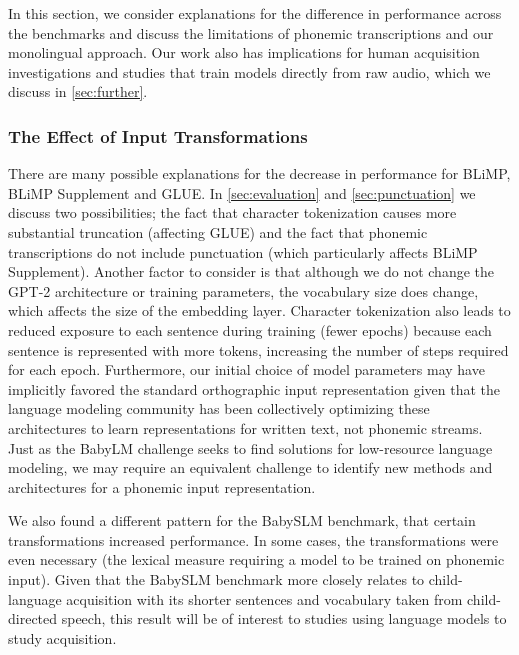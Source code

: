 In this section, we consider explanations for the difference in performance across the benchmarks and discuss the limitations of phonemic transcriptions and our monolingual approach. Our work also has implications for human acquisition investigations and studies that train models directly from raw audio, which we discuss in \cref{sec:further}.

\subsubsection{The Effect of Input Transformations}

There are many possible explanations for the decrease in performance for BLiMP, BLiMP Supplement and GLUE. In \cref{sec:evaluation} and \cref{sec:punctuation} we discuss two possibilities; the fact that character tokenization causes more substantial truncation (affecting GLUE) and the fact that phonemic transcriptions do not include punctuation (which particularly affects BLiMP Supplement). Another factor to consider is that although we do not change the GPT-2 architecture or training parameters, the vocabulary size does change, which affects the size of the embedding layer. Character tokenization also leads to reduced exposure to each sentence during training (fewer epochs) because each sentence is represented with more tokens, increasing the number of steps required for each epoch. Furthermore, our initial choice of model parameters may have implicitly favored the standard orthographic input representation given that the language modeling community has been collectively optimizing these architectures to learn representations for written text, not phonemic streams. Just as the BabyLM challenge seeks to find solutions for low-resource language modeling, we may require an equivalent challenge to identify new methods and architectures for a phonemic input representation. 

We also found a different pattern for the BabySLM benchmark, that certain transformations increased performance. In some cases, the transformations were even necessary (the lexical measure requiring a model to be trained on phonemic input). Given that the BabySLM benchmark more closely relates to child-language acquisition with its shorter sentences and vocabulary taken from child-directed speech, this result will be of interest to studies using language models to study acquisition.


